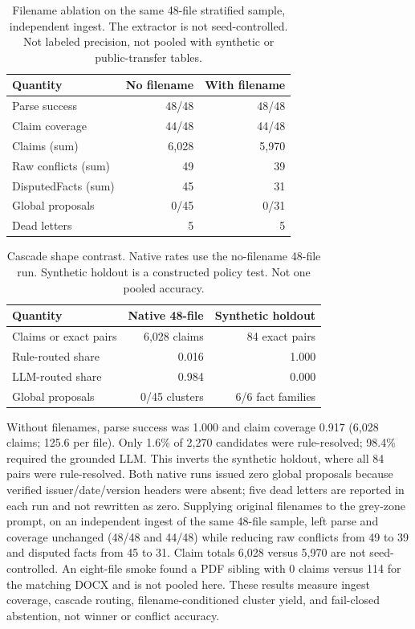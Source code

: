\documentclass[conference]{IEEEtran}
\begin{document}
\begin{table}[t]
\caption{Filename ablation on the same 48-file stratified sample, independent ingest. The extractor is not seed-controlled. Not labeled precision, not pooled with synthetic or public-transfer tables.}
\label{tab:native-filename}
\centering
\small
\begin{tabular}{lrr}
\toprule
Quantity & No filename & With filename \\
\midrule
Parse success & 48/48 & 48/48 \\
Claim coverage & 44/48 & 44/48 \\
Claims (sum) & 6,028 & 5,970 \\
Raw conflicts (sum) & 49 & 39 \\
DisputedFacts (sum) & 45 & 31 \\
Global proposals & 0/45 & 0/31 \\
Dead letters & 5 & 5 \\
\bottomrule
\end{tabular}
\end{table}

\begin{table}[t]
\caption{Cascade shape contrast. Native rates use the no-filename 48-file run. Synthetic holdout is a constructed policy test. Not one pooled accuracy.}
\label{tab:native-vs-synth}
\centering
\small
\begin{tabular}{lrr}
\toprule
Quantity & Native 48-file & Synthetic holdout \\
\midrule
Claims or exact pairs & 6,028 claims & 84 exact pairs \\
Rule-routed share & 0.016 & 1.000 \\
LLM-routed share & 0.984 & 0.000 \\
Global proposals & 0/45 clusters & 6/6 fact families \\
\bottomrule
\end{tabular}
\end{table}

Without filenames, parse success was 1.000 and claim coverage 0.917 (6,028 claims; 125.6 per file). Only 1.6\% of 2,270 candidates were rule-resolved; 98.4\% required the grounded LLM. This inverts the synthetic holdout, where all 84 pairs were rule-resolved. Both native runs issued zero global proposals because verified issuer/date/version headers were absent; five dead letters are reported in each run and not rewritten as zero. Supplying original filenames to the grey-zone prompt, on an independent ingest of the same 48-file sample, left parse and coverage unchanged (48/48 and 44/48) while reducing raw conflicts from 49 to 39 and disputed facts from 45 to 31. Claim totals 6,028 versus 5,970 are not seed-controlled. An eight-file smoke found a PDF sibling with 0 claims versus 114 for the matching DOCX and is not pooled here. These results measure ingest coverage, cascade routing, filename-conditioned cluster yield, and fail-closed abstention, not winner or conflict accuracy.
\end{document}
